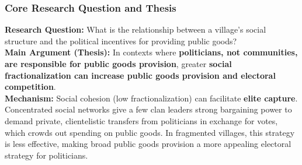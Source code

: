\documentclass{article}
\begin{document}
    \subsubsection{Core Research Question and Thesis}

    \noindent \textbf{Research Question:} What is the relationship between a
village's social structure and the political incentives for providing public
goods?\\

    \noindent \textbf{Main Argument (Thesis):} In contexts where
\textbf{politicians, not communities, are responsible for public goods provision}, greater \textbf{social fractionalization can increase public goods provision and electoral competition}.\\

    \noindent \textbf{Mechanism:} Social cohesion (low fractionalization)
can facilitate \textbf{elite capture}. Concentrated social networks give a
few clan leaders strong bargaining power to demand private, clientelistic
transfers from politicians in exchange for votes, which crowds out spending
on public goods. In fragmented villages, this strategy is less effective,
making broad public goods provision a more appealing electoral strategy for
politicians.
 
\end{document}
